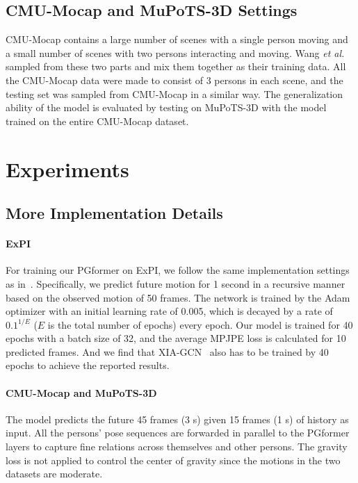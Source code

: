 \documentclass[10pt,twocolumn,letterpaper]{article}
\begin{document}
\subsection{CMU-Mocap and MuPoTS-3D Settings}
CMU-Mocap contains a large number of scenes with a single person moving and a small number of scenes with two persons interacting and moving. 
Wang \textit{et al.}~\cite{wang2021multiperson} sampled from these two parts and mix them together as their training data.
All the CMU-Mocap data were made to consist of 3 persons in each scene, and the testing set was sampled from CMU-Mocap in a similar way. 
The generalization ability of the model is evaluated by testing on MuPoTS-3D with the model trained on the entire CMU-Mocap dataset.

\section{Experiments}
\label{app_sec:exp}




\subsection{More Implementation Details}
\label{app_subsec:implement}
\paragraph{ExPI} 
For training our PGformer on ExPI, we follow the same implementation settings as in~\cite{guo2021multi}. 
Specifically, we predict future motion for 1 second in a recursive manner based on the observed motion of 50 frames. 
The network is trained by the Adam optimizer with an initial learning rate of 0.005, which is decayed by a rate of $0.1^{1/E}$ ($E$ is the total number of epochs) every epoch. 
Our model is trained for 40 epochs with a batch size of 32, and the average MPJPE loss is calculated for 10 predicted frames. 
And we find that XIA-GCN~\cite{guo2021multi} also has to be trained by 40 epochs to achieve the reported results. 

\paragraph{CMU-Mocap and MuPoTS-3D} 
The model predicts the future 45 frames (3 s) given 15 frames (1 s) of history as input. 
All the persons' pose sequences are forwarded in parallel to the PGformer layers to capture fine relations across themselves and other persons. 
The gravity loss is not applied to control the center of gravity since the motions in the two datasets are moderate. 
\end{document}
